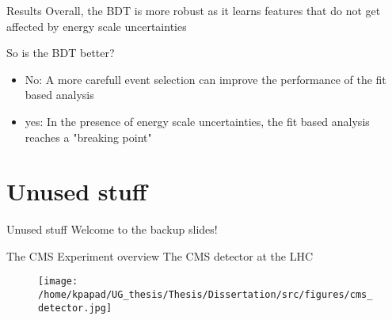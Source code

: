 \documentclass[bigger]{beamer}
\begin{document}
\begin{frame}[label={sec:org27b3b76}]{Results}
Overall, the BDT is more robust as it learns features that do not get affected by energy scale uncertainties\newline

\alert{So is the BDT better?}
\begin{itemize}
\item No: A more carefull event selection can improve the performance of the fit based analysis
\item yes: In the presence of energy scale uncertainties, the fit based analysis reaches a "breaking point"
\end{itemize}
\end{frame}

\section{Unused stuff}
\label{sec:orga2fc1cf}
\begin{frame}[label={sec:org0036d8f}]{Unused stuff}
\alert{Welcome to the backup slides!}
\end{frame}

\begin{frame}[label={sec:org69f0060}]{The CMS Experiment overview}
The CMS detector at the LHC
\begin{figure}[hb]
\centering
\texttt{[image: /home/kpapad/UG\_thesis/Thesis/Dissertation/src/figures/cms\_detector.jpg]}
\end{figure}
\end{frame}
\end{document}
